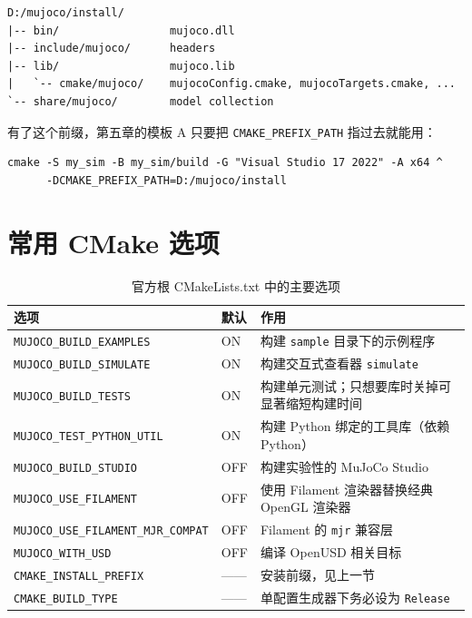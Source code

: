 \begin{lstlisting}[style=code]
D:/mujoco/install/
|-- bin/                 mujoco.dll
|-- include/mujoco/      headers
|-- lib/                 mujoco.lib
|   `-- cmake/mujoco/    mujocoConfig.cmake, mujocoTargets.cmake, ...
`-- share/mujoco/        model collection
\end{lstlisting}

有了这个前缀，第五章的模板 A 只要把 \texttt{CMAKE\_PREFIX\_PATH} 指过去就能用：

\begin{lstlisting}[style=shell]
cmake -S my_sim -B my_sim/build -G "Visual Studio 17 2022" -A x64 ^
      -DCMAKE_PREFIX_PATH=D:/mujoco/install
\end{lstlisting}

\section{常用 CMake 选项}

\begin{table}[H]
	\centering
	\caption{官方根 CMakeLists.txt 中的主要选项}
	\label{tab:Build:选项}
	\footnotesize
	\begin{tabular}{>{\raggedright\arraybackslash}p{5.2cm}>{\raggedright\arraybackslash}p{1.6cm}>{\raggedright\arraybackslash}p{7.4cm}}
		\hline
		选项 & 默认 & 作用 \\
		\hline
		\texttt{MUJOCO\_BUILD\_EXAMPLES} & ON & 构建 \texttt{sample} 目录下的示例程序 \\
		\texttt{MUJOCO\_BUILD\_SIMULATE} & ON & 构建交互式查看器 \texttt{simulate} \\
		\texttt{MUJOCO\_BUILD\_TESTS} & ON & 构建单元测试；只想要库时关掉可显著缩短构建时间 \\
		\texttt{MUJOCO\_TEST\_PYTHON\_UTIL} & ON & 构建 Python 绑定的工具库（依赖 Python） \\
		\texttt{MUJOCO\_BUILD\_STUDIO} & OFF & 构建实验性的 MuJoCo Studio \\
		\texttt{MUJOCO\_USE\_FILAMENT} & OFF & 使用 Filament 渲染器替换经典 OpenGL 渲染器 \\
		\texttt{MUJOCO\_USE\_FILAMENT\_MJR\_COMPAT} & OFF & Filament 的 \texttt{mjr} 兼容层 \\
		\texttt{MUJOCO\_WITH\_USD} & OFF & 编译 OpenUSD 相关目标 \\
		\texttt{CMAKE\_INSTALL\_PREFIX} & —— & 安装前缀，见上一节 \\
		\texttt{CMAKE\_BUILD\_TYPE} & —— & 单配置生成器下务必设为 \texttt{Release} \\
		\hline
	\end{tabular}
\end{table}


